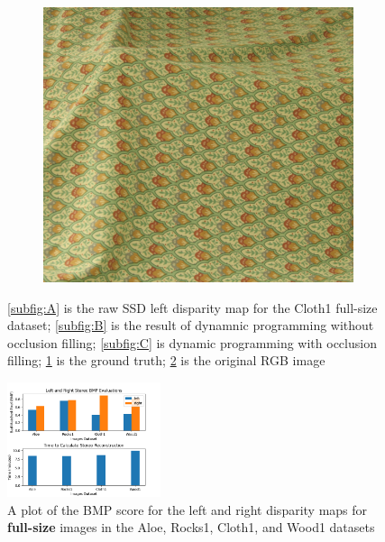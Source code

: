 \documentclass[11pt,a4paper]{article}
\begin{document}
\begin{figure}
\begin{subfigure}[b]{0.2\textwidth}
        \caption{}
        \label{subfig:D}
      \end{subfigure}
      \begin{subfigure}[b]{0.2\textwidth}
        \includegraphics[width=\textwidth]{figures/view5.png}
        \caption{}
        \label{subfig:E}
      \end{subfigure}
    \caption{\ref{subfig:A} is the raw SSD left disparity map for the Cloth1 full-size dataset; \ref{subfig:B} is the result of dynamnic programming without occlusion filling; 
    \ref{subfig:C} is dynamic programming with occlusion filling; \ref{subfig:D} is the ground truth; \ref{subfig:E} is the original RGB image}
    \label{fig:images}
\end{figure}

\begin{figure}
  \centering
  \includegraphics[width=0.40\textwidth]{figures/full_plots.png}
  \caption{A plot of the BMP score for the left and right disparity maps for \textbf{full-size} images in the Aloe, Rocks1, Cloth1, and Wood1 datasets}
  \label{fig:full_plots}
\end{figure}
\end{document}
